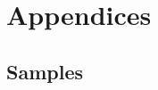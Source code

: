\documentclass[11pt,fleqn,oneside]{book} %
\begin{document}
\renewcommand{\thechapter}{\Alph{chapter}}
\renewcommand{\thesection}{\Alph{chapter}.\Roman{section}}
\renewcommand{\thesubsection}{\Alph{chapter}.\Roman{section}.\alph{subsection}}
\part{Appendices}
\chapter{Samples}

\end{document}
